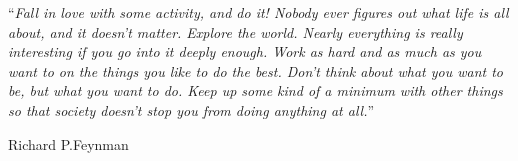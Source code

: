 \cleardoublepage


\vspace*{0.2\textheight}

\noindent\enquote{\itshape Fall in love with some activity, and do it! Nobody ever figures out what life is all about, and it doesn't matter. Explore the world. Nearly everything is really interesting if you go into it deeply enough. Work as hard and as much as you want to on the things you like to do the best. Don't think about what you want to be, but what you want to do. Keep up some kind of a minimum with other things so that society doesn't stop you from doing anything at all.}\bigbreak

\hfill Richard P.Feynman


\begin{abstract}
  \addchaptertocentry{\abstractname} %
  
\end{abstract}


\begin{abstract}
  \addchaptertocentry{\abstractname} %
  
\end{abstract}


\begin{acknowledgements}
  \addchaptertocentry{\acknowledgementname} %
  
\end{acknowledgements}



